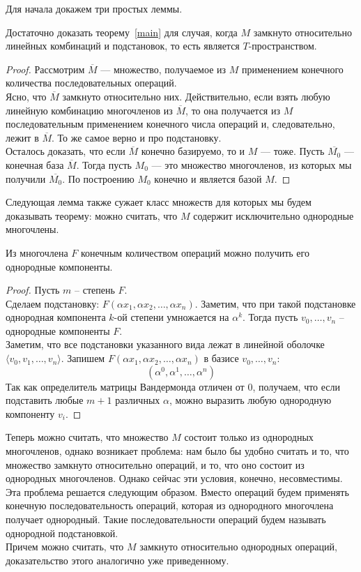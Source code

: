 Для начала докажем три простых леммы.\vskip 0.1in\noindent
\begin{lemma}
    \label{closure}
    Достаточно доказать теорему~\ref{main} для случая, когда $M$ замкнуто относительно линейных комбинаций и подстановок, то есть является $T$-пространством.
\end{lemma}
\begin{proof}
    Рассмотрим $\overline{M}$ --- множество, получаемое из $M$ применением конечного количества последовательных операций.\\
    Ясно, что $\overline{M}$ замкнуто относительно них.
    Действительно, если взять любую линейную комбинацию многочленов из $\overline{M}$, то она получается из $M$ последовательным применением конечного числа операций и, следовательно, лежит в $\overline{M}$.
    То же самое верно и про подстановку.\\
    Осталось доказать, что если $\overline{M}$ конечно базируемо, то и $M$ --- тоже.
    Пусть $\overline{M_0}$ --- конечная база $\overline{M}$.
    Тогда пусть $M_0$ --- это множество многочленов, из которых мы получили $\overline{M_0}$.
    По построению $M_0$ конечно и является базой $M$.
\end{proof}
Следующая лемма также сужает класс множеств для которых мы будем доказывать теорему: можно считать, что $M$ содержит исключительно однородные многочлены.\vskip 0.1in\noindent
\begin{lemma}
    \label{homogen}
    Из многочлена $F$ конечным количеством операций можно получить его однородные компоненты.
\end{lemma}
\begin{proof}
    Пусть $m$ -- степень $F$.\\
    Сделаем подстановку: $F(\alpha x_1, \alpha x_2, \ldots, \alpha x_n)$.
    Заметим, что при такой подстановке однородная компонента $k$-ой степени умножается на $\alpha^k$.
    Тогда пусть $v_0,\ldots,v_n$ -- однородные компоненты $F$. \\
    Заметим, что все подстановки указанного вида лежат в линейной оболочке $\langle v_0,v_1,\ldots,v_n\rangle$.
    Запишем $F(\alpha x_1, \alpha x_2, \ldots, \alpha x_n)$ в базисе $v_0,\ldots,v_n$:
    \[
        (\alpha^0,\alpha^1,\ldots,\alpha^n)
    \]
    Так как определитель матрицы Вандермонда отличен от $0$, получаем, что если подставить любые $m+1$ различных $\alpha$, можно выразить любую однородную компоненту $v_i$.
\end{proof}
Теперь можно считать, что множество $M$ состоит только из однородных многочленов, однако возникает проблема: нам было бы удобно считать и то, что множество замкнуто относительно операций, и то, что оно состоит из однородных многочленов.
Однако сейчас эти условия, конечно, несовместимы.\\
Эта проблема решается следующим образом.
Вместо операций будем применять конечную последовательность операций, которая из однородного многочлена получает однородный.
Такие последовательности операций будем называть однородной подстановкой.\\
Причем можно считать, что $M$ замкнуто относительно однородных операций, доказательство этого аналогично уже приведенному.

